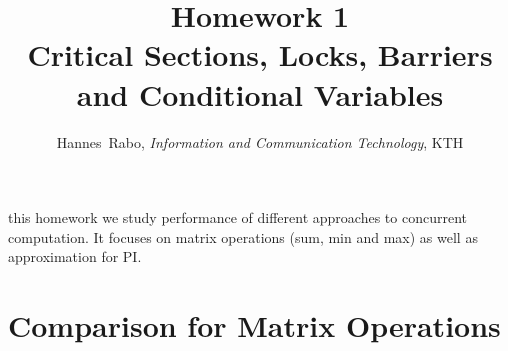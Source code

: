 \documentclass[journal]{IEEEtran}
\begin{document}
\title{Homework 1 \\Critical Sections, Locks, Barriers and Conditional Variables }

\author{Hannes~Rabo, \textit{Information and Communication Technology}, KTH}


%
{}

\maketitle



 this homework we study performance of different approaches to concurrent computation. It focuses on matrix operations (sum, min and max) as well as approximation for PI.

\onecolumn
\section{Comparison for Matrix Operations}
\end{document}
